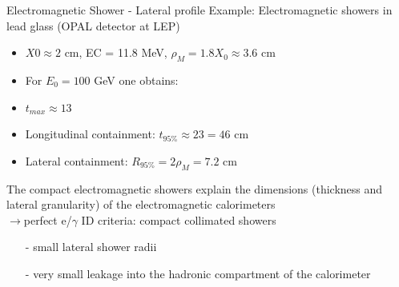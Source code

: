 \documentclass[style=husky,clock,size=9pt,dvipsnames]{powerdot}
\newcommand\ra{$\rightarrow$} %
\begin{document}
\begin{slide}[trans=Fly,toc=]{Electromagnetic Shower - Lateral profile}
	Example: Electromagnetic showers in lead glass (OPAL detector at LEP)
	\begin{tcolorbox}
		\begin{itemize}
			\item $X0 \approx 2$ cm, EC = 11.8 MeV, $\rho_M = 1.8 X_0 \approx 3.6$ cm
			\item For $E_0 = 100$ GeV one obtains:
			\item $t_{max} \approx 13$
			\item Longitudinal containment: $t_{95\%} \approx 23 = 46$ cm
			\item Lateral containment: $R_{95\%} = 2 \rho_M = 7.2$ cm
		\end{itemize}
	\end{tcolorbox}

The compact electromagnetic showers explain the dimensions (thickness and lateral granularity) of the electromagnetic calorimeters\\
\vspace{0.5cm} \ra perfect e/$\gamma$ ID criteria: compact collimated showers
\begin{itemize}
	\item [-] small lateral shower radii
	\item [-] very small leakage into the hadronic compartment of the calorimeter
\end{itemize}
\end{slide}
\end{document}
